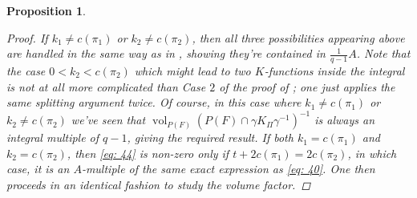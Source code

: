 \documentclass{amsart}
\theoremstyle{plain}
\newtheorem{prop}[thm]{Proposition}
\theoremstyle{plain}
\theoremstyle{remark}
\DeclareMathOperator{\vol}{vol}
\begin{document}
\begin{prop}
\begin{proof}
        If $k_1\neq c(\pi_1)$ or $k_2\neq c(\pi_2)$, then all three possibilities appearing above are handled in the same way as in , showing they're contained in $\tfrac{1}{q-1}A$. Note that the case $0<k_2<c(\pi_2)$ which might lead to two $K$-functions inside the integral is not at all more complicated than \textit{Case} $2$ of the proof of ; one just applies the same splitting argument twice. Of course, in this case where $k_1\neq c(\pi_1)$ or $k_2\neq c(\pi_2)$ we've seen that $\vol_{P(F)}(P(F)\cap\gamma K_\Pi \gamma^{-1})^{-1}$ is always an integral multiple of $q-1$, giving the required result. If both $k_1=c(\pi_1)$ and $k_2=c(\pi_2)$, then \eqref{eq: 44} is non-zero only if $t+2c(\pi_1)=2c(\pi_2)$, in which case, it is an $A$-multiple of the same exact expression as \eqref{eq: 40}. One then proceeds in an identical fashion to study the volume factor.
    \end{proof}
\end{prop}
\end{document}
